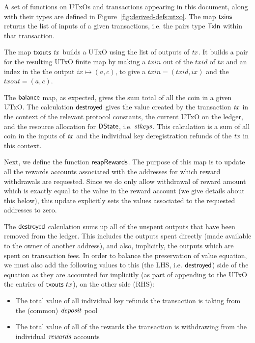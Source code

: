 \documentclass[11pt,a4paper,dvipsnames]{article}
\newcommand{\DState}{\type{DState}}
\newcommand{\TxIn}{\type{TxIn}}
\theoremstyle{definition}
\theoremstyle{definition}
\begin{document}
A set of functions on UTxOs and transactions appearing in this document,
along with their types are defined in Figure~\ref{fig:derived-defs:utxo}.
The map $\mathsf{txins}$ returns the list of inputs of a given transactions, i.e.
the pairs type $\TxIn$ within that transaction.

The map $\mathsf{txouts}~ \mathit{tx}$ builds a UTxO using the
list of outputs of $\mathit{tx}$. It builds a pair for the resulting UTxO
finite map by making a $txin$ out of the $txid$ of $tx$ and an index in the
the output $ix \mapsto (a,c)$, to give a $txin = (txid, ix)$ and the
$txout=(a,c)$.

The $\mathsf{balance}$ map, as expected, gives the sum total of all the coin in
a given UTxO. The calculation $\mathsf{destroyed}$ gives the value created
by the transaction $\mathit{tx}$ in the context of the relevant protocol
constants, the current UTxO on the ledger, and the resource allocation for
$\DState$, i.e. $\mathit{stkeys}$. This calculation is a sum of all coin in the inputs of
$\mathit{tx}$  and the individual key
deregistration refunds of the $\mathit{tx}$ in this context.

Next, we define the function $\mathsf{reapRewards}$. The purpose of this map is
to update all the rewards accounts associated with the addresses for which
reward withdrawals are requested. Since we do only allow withdrawal of reward
amount which is exactly equal to the value in the reward account (we
give details about this below), this update explicitly sets the values
associated to the requested addresses to zero.

The $\mathsf{destroyed}$ calculation sums up all of the unspent outputs that
have been removed from the ledger. This includes the outputs spent directly
(made available to the owner of another address), and also, implicitly,
the outputs which are spent on transaction fees. In order to balance
the preservation of value equation, we must also add the following values
to this (the LHS, i.e. $\mathsf{destroyed}$) side of the equation as they are
accounted for implicitly (as
part of appending to the UTxO the entries of $\mathsf{txouts}~{tx}$), on the
other side (RHS):

\begin{itemize}
\item The total value of all individual key refunds the transaction is taking from
the (common) $\mathit{deposit}$ pool
\item The total value of all of the rewards the transaction is withdrawing from
the individual $\mathit{rewards}$ accounts
\end{itemize}
\end{document}
